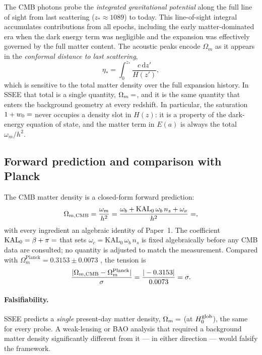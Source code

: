 \documentclass[12pt,a4paper]{article}
\begin{document}
The CMB photons probe the \emph{integrated gravitational potential}
along the full line of sight from last scattering ($z_*\approx1089$) to today.
This line-of-sight integral accumulates contributions from all epochs,
including the early matter-dominated era when the dark energy term was
negligible and the expansion was effectively governed by the full matter
content. The acoustic peaks encode $\Omega_m$ as it appears in the
\emph{conformal distance to last scattering},
\begin{equation}
  \eta_* = \int_0^{z_*} \frac{c\,\mathrm{d}z'}{H(z')},
\end{equation}
which is sensitive to the total matter density over the full expansion
history. In SSEE that total is a single quantity, $\Omega_m=\val{OMEGA_M_TOTAL_d6}$,
and it is the same quantity that enters the background geometry at every
redshift. In particular, the saturation $1+w_0=\val{S_M_d6}$ never occupies a density
slot in $H(z)$: it is a property of the dark-energy equation of state, and the
matter term in $E(a)$ is always the total $\omega_m/h^2$.

\subsection{Forward prediction and comparison with Planck}

The CMB matter density is a closed-form forward prediction:
\begin{equation}
  \Omega_{m,\mathrm{CMB}} = \frac{\omega_m}{h^2}
    = \frac{\omega_b + \mathrm{KAL}_0\,\omega_b\,n_s + \omega_\nu}{h^2}
    = \val{OMEGA_M_TOTAL_d4},
  \label{eq:om_cmb_algebraic}
\end{equation}
with every ingredient an algebraic identity of Paper~1. The coefficient
$\mathrm{KAL}_0=\beta+\pi=\val{KAL0_d6}$ that sets
$\omega_c=\mathrm{KAL}_0\,\omega_b\,n_s$ is fixed algebraically before any CMB
data are consulted; no quantity is adjusted to match the measurement.
Compared with $\Omega_m^{\mathrm{Planck}}=0.3153\pm0.0073$
\citep{Planck2018}, the tension is
\begin{equation}
\frac{|\Omega_{m,\mathrm{CMB}} - \Omega_m^{\mathrm{Planck}}|}{\sigma}
= \frac{|\val{OMEGA_M_TOTAL_d6}-0.3153|}{0.0073} = \val{om_planck_sig}\sigma .
\end{equation}


\paragraph{Falsifiability.}
SSEE predicts a \emph{single} present-day matter density, $\Omega_m=\val{OMEGA_M_TOTAL_d6}$
(at $H_0^{\rm glob}$), the same for every probe. A weak-lensing or BAO analysis that
required a background matter density significantly different from it --- in either
direction --- would falsify the framework.
\end{document}

